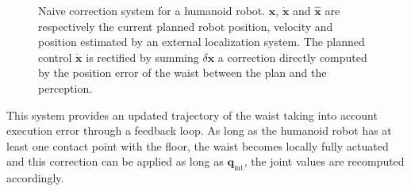 \begin{figure}[ht!]
  \begin{center}
  \end{center}
  \caption{Naive correction system for a humanoid robot. $\mathbf{x}$,
    $\mathbf{\dot{x}}$ and $\mathbf{\hat{x}}$ are respectively the
    current planned robot position, velocity and position estimated by
    an external localization system. The planned control
    $\mathbf{\dot{x}}$ is rectified by summing $\delta \mathbf{x}$ a
    correction directly computed by the position error of the waist
    between the plan and the perception. \label{fig:system}}
\end{figure}


This system provides an updated trajectory of the waist taking into
account execution error through a feedback loop. As long as the
humanoid robot has at least one contact point with the floor, the
waist becomes locally fully actuated and this correction can be applied
as long as $\mathbf{q}_{\text{int}}$, the joint values are recomputed
accordingly.


